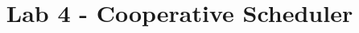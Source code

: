 \documentclass[twoside,final]{hcmut-report}
\title{Lab 4 - Cooperative Scheduler}
\begin{document}
\coverpage%

\tableofcontents

\clearpage


\end{document}
